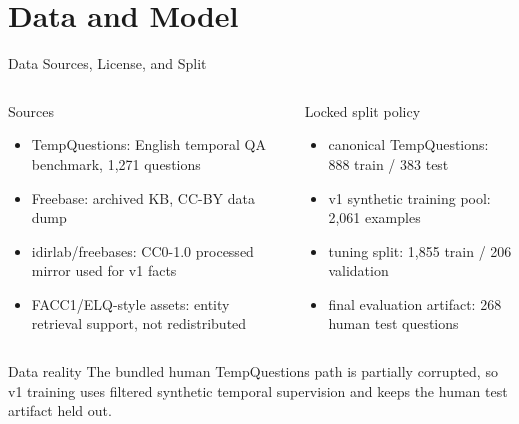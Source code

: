 
\section{Data and Model}

\begin{frame}[shrink=12]{Data Sources, License, and Split}
  \begin{columns}[T]
    \begin{block}{Sources}
      \small
      \begin{itemize}
        \item TempQuestions: English temporal QA benchmark, 1,271 questions~\parencite{jia2018tempquestions}
        \item Freebase: archived KB, CC-BY data dump~\parencite{bollacker2008freebase}
        \item idirlab/freebases: CC0-1.0 processed mirror used for v1 facts
        \item FACC1/ELQ-style assets: entity retrieval support, not redistributed
      \end{itemize}
    \end{block}
    \begin{exampleblock}{Locked split policy}
      \small
      \begin{itemize}
        \item canonical TempQuestions: 888 train / 383 test
        \item v1 synthetic training pool: 2,061 examples
        \item tuning split: 1,855 train / 206 validation
        \item final evaluation artifact: 268 human test questions
      \end{itemize}
    \end{exampleblock}
  \end{columns}
  \vspace{0.1cm}
  \begin{alertblock}{Data reality}
    The bundled human TempQuestions path is partially corrupted, so v1 training uses filtered synthetic temporal supervision and keeps the human test artifact held out.
  \end{alertblock}
\end{frame}

